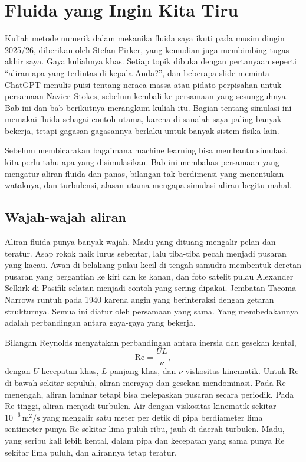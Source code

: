 \chapter{Fluida yang Ingin Kita Tiru}
\label{ch:fluida}

Kuliah metode numerik dalam mekanika fluida saya ikuti pada musim dingin 2025/26, diberikan oleh
Stefan Pirker, yang kemudian juga membimbing tugas akhir saya. Gaya kuliahnya khas. Setiap topik
dibuka dengan pertanyaan seperti ``aliran apa yang terlintas di kepala Anda?'', dan beberapa slide
meminta ChatGPT menulis puisi tentang neraca massa atau pidato perpisahan untuk persamaan
Navier--Stokes, sebelum kembali ke persamaan yang sesungguhnya. Bab ini dan bab berikutnya merangkum
kuliah itu. Bagian tentang simulasi ini memakai fluida sebagai contoh utama, karena di sanalah
saya paling banyak bekerja, tetapi gagasan-gagasannya berlaku untuk banyak sistem fisika lain.

Sebelum membicarakan bagaimana machine learning bisa membantu simulasi, kita perlu tahu apa yang
disimulasikan. Bab ini membahas persamaan yang mengatur aliran fluida dan panas, bilangan tak
berdimensi yang menentukan wataknya, dan turbulensi, alasan utama mengapa simulasi aliran begitu mahal.

\section{Wajah-wajah aliran}

Aliran fluida punya banyak wajah. Madu yang dituang mengalir pelan dan teratur. Asap rokok naik lurus
sebentar, lalu tiba-tiba pecah menjadi pusaran yang kacau. Awan di belakang pulau kecil di tengah
samudra membentuk deretan pusaran yang bergantian ke kiri dan ke kanan, dan foto satelit pulau
Alexander Selkirk di Pasifik selatan menjadi contoh yang sering dipakai. Jembatan Tacoma Narrows
runtuh pada 1940 karena angin yang berinteraksi dengan getaran strukturnya. Semua ini diatur oleh
persamaan yang sama. Yang membedakannya adalah perbandingan antara gaya-gaya yang bekerja.

Bilangan Reynolds menyatakan perbandingan antara inersia dan gesekan kental,
\begin{equation}
\mathrm{Re}=\frac{UL}{\nu},
\end{equation}
dengan $U$ kecepatan khas, $L$ panjang khas, dan $\nu$ viskositas kinematik. Untuk Re di bawah
sekitar sepuluh, aliran merayap dan gesekan mendominasi. Pada Re menengah, aliran laminar tetapi
bisa melepaskan pusaran secara periodik. Pada Re tinggi, aliran menjadi turbulen. Air dengan
viskositas kinematik sekitar $10^{-6}\,\mathrm{m^2/s}$ yang mengalir satu meter per detik di pipa
berdiameter lima sentimeter punya Re sekitar lima puluh ribu, jauh di daerah turbulen. Madu, yang
seribu kali lebih kental, dalam pipa dan kecepatan yang sama punya Re sekitar lima puluh, dan
alirannya tetap teratur.

